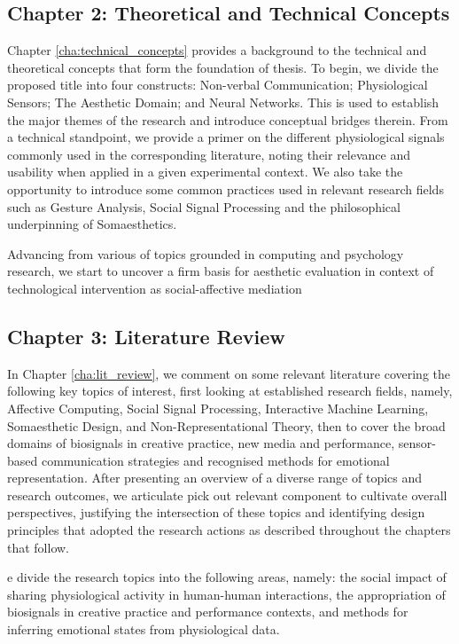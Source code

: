 \subsection{Chapter 2: Theoretical and Technical Concepts}

Chapter \ref{cha:technical_concepts} provides a background to the technical and theoretical concepts that form the foundation of thesis. To begin, we divide the proposed title into four constructs: Non-verbal Communication; Physiological Sensors; The Aesthetic Domain; and Neural Networks. This is used to establish the major themes of the research and introduce conceptual bridges therein. From a technical standpoint, we provide a primer on the different physiological signals commonly used in the corresponding literature, noting their relevance and usability when applied in a given experimental context. We also take the opportunity to introduce some common practices used in relevant research fields such as Gesture Analysis, Social Signal Processing and the philosophical underpinning of Somaesthetics.

Advancing from various of topics grounded in computing and psychology research, we start to uncover a firm basis for aesthetic evaluation in context of technological intervention as social-affective mediation

\subsection{Chapter 3: Literature Review}

In Chapter \ref{cha:lit_review}, we comment on some relevant literature covering the following key topics of interest, first looking at established research fields, namely, Affective Computing, Social Signal Processing, Interactive Machine Learning, Somaesthetic Design, and Non-Representational Theory, then to cover the broad domains of biosignals in creative practice, new media and performance, sensor-based communication strategies and recognised methods for emotional representation. After presenting an overview of a diverse range of topics and research outcomes, we articulate pick out relevant component to cultivate overall perspectives, justifying the intersection of these topics and identifying design principles that adopted the research actions as described throughout the chapters that follow.

e divide the research topics into the following areas, namely: the social impact of sharing physiological activity in human-human interactions, the appropriation of biosignals in creative practice and performance contexts, and methods for inferring emotional states from physiological data.


